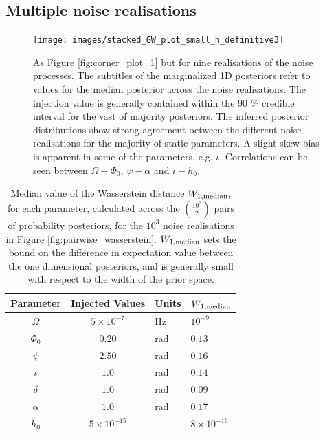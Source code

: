 \documentclass[fleqn,usenatbib,useAMS]{mnras}
\begin{document}
\subsection{Multiple noise realisations} \label{sec:multiple_noise}
\begin{figure}
	\texttt{[image: images/stacked\_GW\_plot\_small\_h\_definitive3]}
	\caption{As Figure \ref{fig:corner_plot_1} but for nine realisations of the noise processes. The subtitles of the marginalized 1D posteriors refer to values for the median posterior across the noise realisations. The injection value is generally contained within the 90 \% credible interval for the vast of majority posteriors. The inferred posterior distributions show strong agreement between the different noise realisations for the majority of static parameters. A slight skew-bias is apparent in some of the parameters, e.g. $\iota$. Correlations can be seen between $\Omega - \Phi_0$, $\psi-\alpha$ and $\iota - h_0$.} 
	\label{fig:corner_plot_2}
\end{figure}
\begin{table}
	\centering
	\begin{tabular}{ccll}
		\toprule
		Parameter & Injected Values & Units & $W_{1, \rm median}$  \\
		\hline
		$\Omega$     &   $5 \times 10^{-7}$ & Hz & $10^{-9}$ \\
		$\Phi_0$          & $0.20$ & rad & $0.13$ \\
		$\psi$              & $2.50$ & rad & $0.16$ \\
		$\iota$             & $1.0$ & rad & $0.14$ \\ 
		$\delta$              & $1.0$  & rad & $0.09$ \\
		$\alpha$          & $1.0$  & rad & $0.17$\\
		$h_0$            & $5 \times 10^{-15}$ & - & $8 \times 10^{-16}$ \\
		\bottomrule
	\end{tabular}
	\caption{Median value of the Wasserstein distance $W_{1, \rm median}$, for each parameter, calculated across the $10^3 \choose 2$ pairs of probability posteriors, for the $10^3$ noise realisations in Figure \ref{fig:pairwise_wasserstein}. $W_{1, \rm median}$  sets the bound on the difference in expectation value between the one dimensional posteriors, and is generally small with respect to the width of the prior space.}
	\label{tab:Wasserstein}
\end{table}
\end{document}
